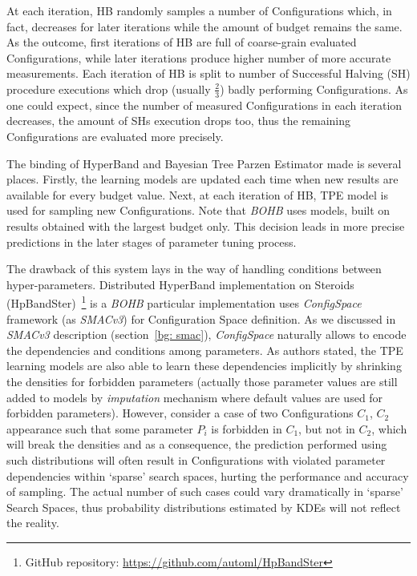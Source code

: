 At each iteration, HB randomly samples a number of Configurations which, in fact, decreases for later iterations while the amount of budget remains the same. As the outcome, first iterations of HB are full of coarse-grain evaluated Configurations, while later iterations produce higher number of more accurate measurements. Each iteration of HB is split to number of Successful Halving (SH) procedure executions which drop (usually $\frac{2}{3}$) badly performing Configurations. As one could expect, since the number of measured Configurations in each iteration decreases, the amount of SHs execution drops too, thus the remaining Configurations are evaluated more precisely.

The binding of HyperBand and Bayesian Tree Parzen Estimator made is several places. Firstly, the learning models are updated each time when new results are available for every budget value. Next, at each iteration of HB, TPE model is used for sampling new Configurations. Note that \textit{BOHB} uses models, built on results obtained with the largest budget only. This decision leads in more precise predictions in the later stages of parameter tuning process.

The drawback of this system lays in the way of handling conditions between hyper-parameters. Distributed HyperBand implementation on Steroids (HpBandSter)~\footnote{GitHub repository: \url{https://github.com/automl/HpBandSter}} is a \textit{BOHB} particular implementation uses \textit{ConfigSpace} framework (as \textit{SMACv3}) for Configuration Space definition. As we discussed in \textit{SMACv3} description (section~\ref{bg: smac}), \textit{ConfigSpace} naturally allows to encode the dependencies and conditions among parameters. As authors stated, the TPE learning models are also able to learn these dependencies implicitly by shrinking the densities for forbidden parameters (actually those parameter values are still added to models by \textit{imputation} mechanism where default values are used for forbidden parameters). However, consider a case of two Configurations $C_1$, $C_2$ appearance such that some parameter $P_i$ is forbidden in $C_1$, but not in $C_2$, which will break the densities and as a consequence, the prediction performed using such distributions will often result in Configurations with violated parameter dependencies within `sparse' search spaces, hurting the performance and accuracy of sampling. The actual number of such cases could vary dramatically in `sparse' Search Spaces, thus probability distributions estimated by KDEs will not reflect the reality.


